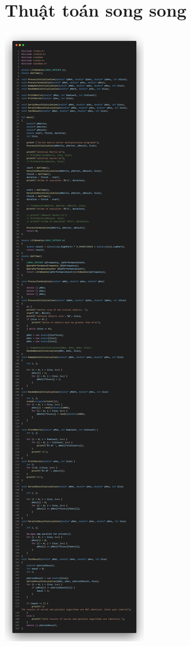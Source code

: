 \documentclass[12pt,a4paper]{report}
\begin{document}
\section{Thuật toán song song}
\begin{center}
	\includegraphics[trim=0in 85in 0in 0in, clip, scale=0.25]{./Photos/MatMul/parallel.PNG}

\end{center}
\end{document}
